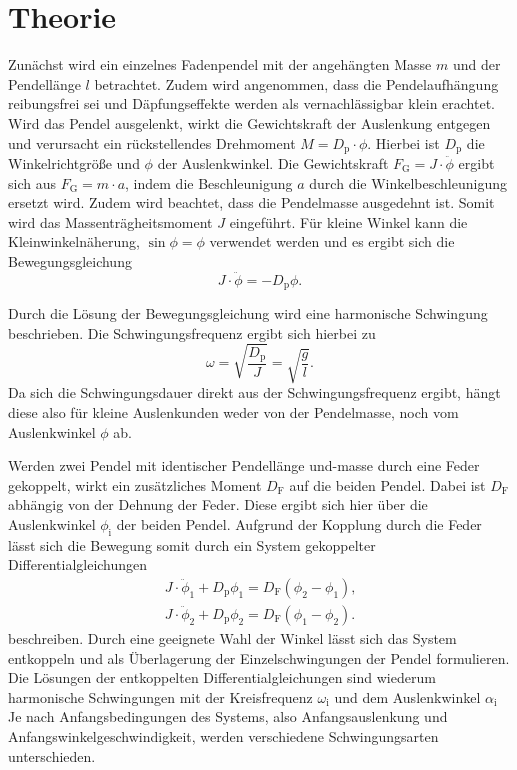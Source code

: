 \section{Theorie}
\label{sec:Theorie}
Zunächst wird ein einzelnes Fadenpendel mit der angehängten Masse $m$ und der Pendellänge $l$ betrachtet.
Zudem wird angenommen, dass die Pendelaufhängung reibungsfrei sei und Däpfungseffekte werden als vernachlässigbar klein erachtet.
Wird das Pendel ausgelenkt, wirkt die Gewichtskraft der Auslenkung entgegen und verursacht ein rückstellendes Drehmoment $M=D_{\mathrm{p}}\cdot \phi$.
Hierbei ist $D_{\mathrm{p}}$ die Winkelrichtgröße und $\phi$ der Auslenkwinkel.
Die Gewichtskraft $F_{\mathrm{G}}=J\cdot\ddot\phi$ ergibt sich aus $F_{\mathrm{G}}=m\cdot a$, indem die Beschleunigung $a$ durch die Winkelbeschleunigung ersetzt wird.
Zudem wird beachtet, dass die Pendelmasse ausgedehnt ist. Somit wird das Massenträgheitsmoment $J$ eingeführt.
Für kleine Winkel kann die Kleinwinkelnäherung, $\sin{\phi}=\phi$ verwendet werden und es ergibt sich die Bewegungsgleichung
\begin{equation}
	J\cdot \ddot\phi=-D_{\mathrm{p}}\phi \text{.}
\end{equation}

Durch die Lösung der Bewegungsgleichung wird eine harmonische Schwingung beschrieben. Die Schwingungsfrequenz ergibt sich hierbei zu
\begin{equation}
	\omega=\sqrt{\frac{D_{\mathrm{p}}}{J}}=\sqrt{\frac{g}{l}} \text{.}
\end{equation}
Da sich die Schwingungsdauer direkt aus der Schwingungsfrequenz ergibt, hängt diese also für kleine Auslenkunden weder von der Pendelmasse, noch vom Auslenkwinkel $\phi$ ab.

Werden zwei Pendel mit identischer Pendellänge und-masse durch eine Feder gekoppelt, wirkt ein zusätzliches Moment $D_{\mathrm{F}}$ auf die beiden Pendel.
Dabei ist $D_{\mathrm{F}}$ abhängig von der Dehnung der Feder. Diese ergibt sich hier über die Auslenkwinkel $\phi_{\mathrm{i}}$ der beiden Pendel.
Aufgrund der Kopplung durch die Feder lässt sich die Bewegung somit durch ein System gekoppelter Differentialgleichungen
\begin{gather}
	J\cdot \ddot \phi_1 + D_{\mathrm{p}} \phi_1=D_{\mathrm{F}}(\phi_2-\phi_1)\text{,}\\
	J\cdot \ddot \phi_2 + D_{\mathrm{p}} \phi_2=D_{\mathrm{F}}(\phi_1-\phi_2)\text{.}
\end{gather}
beschreiben.
Durch eine geeignete Wahl der Winkel lässt sich das System entkoppeln und als Überlagerung der Einzelschwingungen der Pendel formulieren.
Die Lösungen der entkoppelten Differentialgleichungen sind wiederum harmonische Schwingungen mit der Kreisfrequenz $\omega_{\mathrm{i}}$ und dem Auslenkwinkel $\alpha_{\mathrm{i}}$
Je nach Anfangsbedingungen des Systems, also Anfangsauslenkung und Anfangswinkelgeschwindigkeit, werden verschiedene Schwingungsarten unterschieden.
